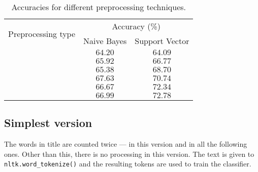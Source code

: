\begin{table}[ht]
    \centering
    \caption{Accuracies for different preprocessing techniques.}
    \label{tab:bayes_table}
    \vspace{1em}
    \begin{tabular}[htpb]{c|c|c}
        \multirow{2}{*}{Preprocessing type} & \multicolumn{2}{c}{Accuracy (\%)} \\
        \cline{2-3}
                                            &
        Naive Bayes
                                            & Support Vector                    \\
        \hline\hline
        \nameref{sec:simple}
                                            & $64.20$
                                            & $64.09$                           \\
        \hline
        \nameref{sec:lowercase}
                                            & $65.92$
                                            & $66.77$                           \\
        \hline
        \nameref{sec:punctuation}
                                            & $65.38$
                                            & $68.70$                           \\
        \hline
        \nameref{sec:stopwords}
                                            & $67.63$
                                            & $70.74$                           \\
        \hline
        \nameref{sec:stemming}              & $66.67$
                                            & $72.34$                           \\
        \hline
        \nameref{sec:shortwords}            & $66.99$
                                            & $72.78$                           \\
    \end{tabular}
\end{table}

\subsection{Simplest version}
\label{sec:simple}

The words in title are counted twice --- in this version and in all the following ones. Other than this, there is no processing in this version. The text is given to \texttt{nltk.word_tokenize()} and the resulting tokens are used to train the classifier.


